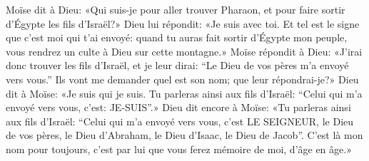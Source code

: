 Moïse dit à Dieu: «Qui suis-je pour aller trouver Pharaon,
	et pour faire sortir d’Égypte les fils d’Israël?»
Dieu lui répondit: «Je suis avec toi.
Et tel est le signe que c’est moi qui t’ai envoyé:
	quand tu auras fait sortir d’Égypte mon peuple,
	vous rendrez un culte à Dieu sur cette montagne.»
Moïse répondit à Dieu:
	«J’irai donc trouver les fils d’Israël, et je leur dirai:
	“Le Dieu de vos pères m’a envoyé vers vous.”
Ils vont me demander quel est son nom; que leur répondrai-je?»
Dieu dit à Moïse: «Je suis qui je suis.
Tu parleras ainsi aux fils d’Israël:
	“Celui qui m’a envoyé vers vous, c’est: JE-SUIS”.»
Dieu dit encore à Moïse: «Tu parleras ainsi aux fils d’Israël:
	“Celui qui m’a envoyé vers vous, c’est LE SEIGNEUR, le Dieu de vos pères,
	le Dieu d’Abraham, le Dieu d’Isaac, le Dieu de Jacob”.
C’est là mon nom pour toujours,
	c’est par lui que vous ferez mémoire de moi, d’âge en âge.»
